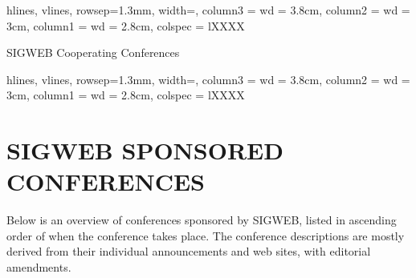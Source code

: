 \documentclass{scrartcl}
\begin{document}
\begin{titlepage}
    \begin{table}[h!]
    \centering
    \begin{tblr}{
        hlines,
        vlines,
        rowsep=1.3mm,
        width=\linewidth,
        column{3} = {wd = 3.8cm},
        column{2} = {wd = 3cm},
        column{1} = {wd = 2.8cm},
        colspec = {lXXXX}
    }
\end{tblr}
\end{table}

\noindent SIGWEB Cooperating Conferences

    \begin{table}[h!]
    \centering
    \begin{tblr}{
        hlines,
        vlines,
        rowsep=1.3mm,
        width=\linewidth,
        column{3} = {wd = 3.8cm},
        column{2} = {wd = 3cm},
        column{1} = {wd = 2.8cm},
        colspec = {lXXXX}
    }
\end{tblr}
\end{table}

\end{titlepage}


\section*{SIGWEB SPONSORED CONFERENCES}

Below is an overview of conferences sponsored by SIGWEB, listed in ascending order of when the
conference takes place. The conference descriptions are mostly derived from their individual
announcements and web sites, with editorial amendments.


\end{document}
